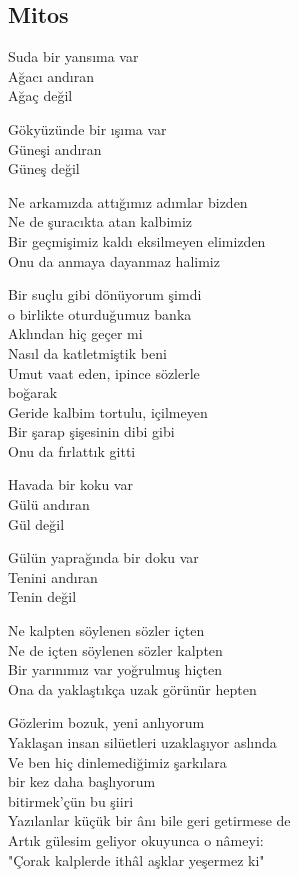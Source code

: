 \subsection{Mitos}

Suda bir yansıma var \\
Ağacı andıran \\
Ağaç değil

\noindent\newline
Gökyüzünde bir ışıma var \\
Güneşi andıran \\
Güneş değil

\noindent\newline
Ne arkamızda attığımız adımlar bizden \\
Ne de şuracıkta atan kalbimiz \\
Bir geçmişimiz kaldı eksilmeyen elimizden \\
Onu da anmaya dayanmaz halimiz

\noindent\newline
Bir suçlu gibi dönüyorum şimdi \\
o birlikte oturduğumuz banka \\
Aklından hiç geçer mi \\
Nasıl da katletmiştik beni \\
Umut vaat eden, ipince sözlerle \\
	boğarak \\
Geride kalbim tortulu, içilmeyen \\
Bir şarap şişesinin dibi gibi \\
Onu da fırlattık gitti

\noindent\newline
Havada bir koku var \\
Gülü andıran \\
Gül değil

\noindent\newline
Gülün yaprağında bir doku var \\
Tenini andıran \\
Tenin değil

\noindent\newline
Ne kalpten söylenen sözler içten \\
Ne de içten söylenen sözler kalpten \\
Bir yarınımız var yoğrulmuş hiçten \\
Ona da yaklaştıkça uzak görünür hepten

\noindent\newline
Gözlerim bozuk, yeni anlıyorum \\
Yaklaşan insan silüetleri uzaklaşıyor aslında \\
Ve ben hiç dinlemediğimiz şarkılara \\
bir kez daha başlıyorum \\
bitirmek'çün bu şiiri \\
Yazılanlar küçük bir ânı bile geri getirmese de \\
Artık gülesim geliyor okuyunca o nâmeyi: \\
	"Çorak kalplerde ithâl aşklar yeşermez ki"